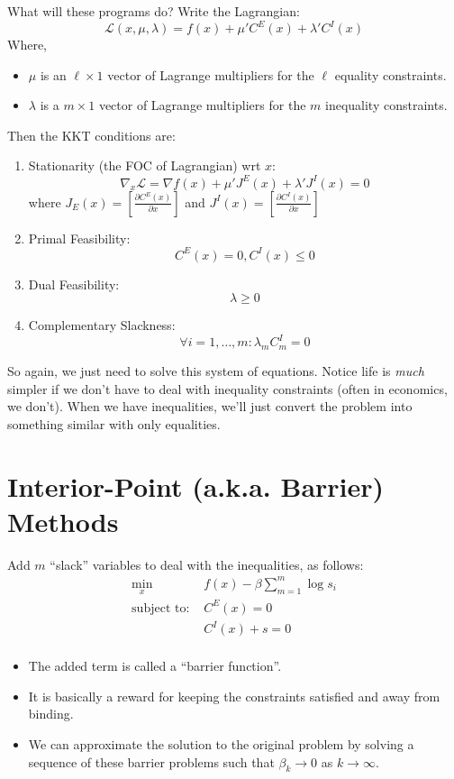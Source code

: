 \documentclass[twoside]{article}
\begin{document}
What will these programs do? Write the Lagrangian: 
$$ \mathcal{L}(x, \mu, \lambda) = f(x) + \mu' C^E(x) + \lambda' C^I(x) $$
Where,
\begin{itemize} 
\item $\mu$ is an $\ell \times 1$ vector of Lagrange multipliers for the $\ell$ equality constraints. 
\item $\lambda$ is a $m \times 1$ vector of Lagrange multipliers for the $m$ inequality constraints. 
\end{itemize}
Then the KKT conditions are:
\begin{enumerate}
\item Stationarity (the FOC of Lagrangian) wrt $x$: 
$$ \nabla_x \mathcal{L} = \nabla f(x) + \mu' J^E(x) + \lambda' J^I(x) = 0 $$
where $J_E(x) = \left[ \frac{\partial C^E(x)}{\partial x} \right]$ and $J^I(x) = \left[ \frac{\partial C^I(x)}{\partial x} \right]$
\item Primal Feasibility:
$$C^E(x) = 0, C^I(x) \leq 0 $$
\item Dual Feasibility: 
$$\lambda \geq 0$$
\item Complementary Slackness:
$$ \forall i = 1, \ldots, m: \lambda_m C^I_m = 0 $$
\end{enumerate}
So again, we just need to solve this system of equations.  Notice life is {\it much} simpler if we don't have to deal with inequality constraints (often in economics, we don't). When we have inequalities, we'll just convert the problem into something similar with only equalities. 

\section{Interior-Point (a.k.a. Barrier) Methods}

Add $m$ ``slack'' variables to deal with the inequalities, as follows: 
\begin{align*}
\min_x & f(x) - \beta \sum_{m=1}^m \log s_i \\
\mbox{subject to: } & C^E(x) = 0 \\
& C^I(x) + s = 0 \\ 
\end{align*}
\begin{itemize}
\item The added term is called a ``barrier function''. 
\item It is basically a reward for keeping the constraints satisfied and away from binding. 
\item We can approximate the solution to the original problem by solving a sequence of these barrier problems such that $\beta_k \rightarrow 0$ as $k\rightarrow \infty$. 
\end{itemize}
 
\end{document}

